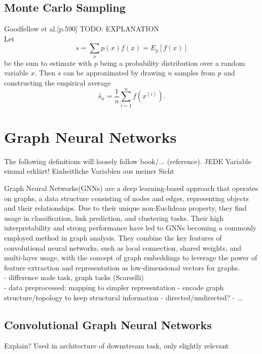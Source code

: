 \subsection{Monte Carlo Sampling}
Goodfellow et al.\cite{Goodfellow-et-al-2016}[p.590] TODO: EXPLANATION \\
Let 
\begin{equation}
    s = \sum_x p(x)f(x)=E_p[f(x)]
\end{equation}
be the sum to estimate with $p$ being a probability distribution over a random variable $x$. Then $s$ can be approximated by drawing $n$ samples from $p$ and constructing the empirical average 
\begin{equation}
    \hat{s}_n=\frac{1}{n}\sum_{i=1}^n f(x^{(i)}).
\end{equation}

\section{Graph Neural Networks}

The following definitions will loosely follow book/... (reference).
JEDE Variable einmal erklärt! Einheitliche Variablen aus meiner Sicht

Graph Neural Networks(GNNs)\cite{4700287} are a deep learning-based approach that operates on graphs, a data structure consisting of nodes and edges, representing objects and their relationships. Due to their unique non-Euclidean property, they find usage in classification, link prediction, and clustering tasks. Their high interpretability and strong performance have led to GNNs becoming a commonly employed method in graph analysis. They combine the key features of convolutional neural networks\cite{726791}, such as local connection, shared weights, and multi-layer usage, with the concept of graph embeddings\cite{cai2018comprehensive} to leverage the power of feature extraction and representation as low-dimensional vectors for graphs\cite{Liu2020}. \\
- difference node task, graph tasks (Scarselli) \\
- data preprocessed: mapping to simpler representation
- encode graph structure/topology to keep structural information
- directed/undirected?
- ...



\subsection{Convolutional Graph Neural Networks}
Explain? Used in architecture of downstream task, only slightly relevant

